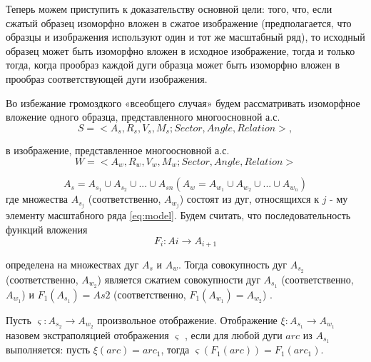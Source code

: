 Теперь можем приступить  к доказательству основной цели: того, что, если сжатый образец изоморфно вложен в сжатое изображение (предполагается, что образцы и изображения используют один и тот же масштабный ряд), то исходный  образец может быть изоморфно вложен в исходное изображение, тогда и только тогда, когда прообраз каждой дуги образца может быть изоморфно вложен в прообраз соответствующей дуги изображения.

Во избежание громоздкого «всеобщего случая» будем рассматривать изоморфное вложение одного образца, представленного многоосновной  а.с.  
\begin{equation}
S  = < A_s, R_s, V_s, M_s; Sector, Angle, Relation >,                     %
\label{scale:9}
\end{equation}
          
в изображение,  представленное многоосновной а.с.  
\begin{equation}
W  = < A_w, R_w, V_w, M_w; Sector,  Angle, Relation >                     %
\label{scale:10}
\end{equation}

\begin{equation}
A_s = A_{s_1} \cup A_{s_2} \cup ... \cup A_{sn}  (A_w = A_{w_1} \cup A_{w_2} \cup ... \cup A_{w_n})                     %
\label{scale:11}
\end{equation}
где  множества   $A_{s_j}$ (соответственно,  $A_{w_j}$) состоят из дуг, относящихся к $j$ - му элементу   масштабного ряда \ref{eq:model}. 
Будем считать, что последовательность функций вложения  
\begin{equation}
F_i : Ai \to A_{i+1}  %
\label{scale:12}
\end{equation}

определена на множествах дуг $A_s$  и $A_w$.  Тогда совокупность дуг $A_{s_2}$ (соответственно,  $A_{w_2}$) является  сжатием   совокупности дуг   $A_{s_1}$ (соответственно,  $A_{w_1}$)    и  $F_1 ( A_{s_1})  =  As2$ (соответственно,  $F_1 ( A_{w_1} )  =  A_{w_2}$) .  

\begin{definition}
Пусть $\varsigma : A_{s_2} \to A_{w_2}$  произвольное отображение. Отображение $\xi : A_{s_1} \to A_{w_1}$ назовем экстраполяцией отображения $\varsigma$ , если для любой дуги   $arc$  из $A_{s_1}$ выполняется:  пусть $\xi(arc)  =  arc_1$,   тогда  $\varsigma (F_1(arc) )  =  F_1(arc_1)$. 
\end{definition}
          
